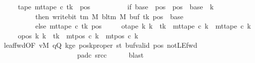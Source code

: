 \begin{isabellebody}
\ \ \ \ \ tape{}{\isacharcolon}{\kern0pt}\ {\isachardoublequoteopen}mt{\isacharunderscore}{\kern0pt}tape\ c{}\ tk\ {\isacharequal}{\kern0pt}\ {\isacharparenleft}{\kern0pt}{\isasymlambda}pos{\isachardot}{\kern0pt}\isanewline
\ \ \ \ \ \ \ \ \ \ if\ base\ {\isasymle}\ pos\ {\isasymand}\ pos\ {\isacharless}{\kern0pt}\ base\ {\isacharplus}{\kern0pt}\ {\isacharparenleft}{\kern0pt}{\isacharquery}{\kern0pt}k\ {\isacharminus}{\kern0pt}\ {}{\isacharparenright}{\kern0pt}\isanewline
\ \ \ \ \ \ \ \ \ \ then\ write{\isacharunderscore}{\kern0pt}bit\ {\isacharparenleft}{\kern0pt}{\isasymGamma}{\isacharunderscore}{\kern0pt}tm\ M{\isacharparenright}{\kern0pt}\ {\isacharparenleft}{\kern0pt}bl{\isacharunderscore}{\kern0pt}tm\ M{\isacharparenright}{\kern0pt}\ {\isacharparenleft}{\kern0pt}buf\ tk{\isacharparenright}{\kern0pt}\ {\isacharparenleft}{\kern0pt}pos\ {\isacharminus}{\kern0pt}\ base{\isacharparenright}{\kern0pt}\isanewline
\ \ \ \ \ \ \ \ \ \ else\ mt{\isacharunderscore}{\kern0pt}tape\ c{}\ tk\ pos{\isacharparenright}{\kern0pt}{\isachardoublequoteclose}\isanewline
\ \ \ \ \ otape{}{\isacharcolon}{\kern0pt}\ {\isachardoublequoteopen}{\isasymforall}k{\isacharprime}{\kern0pt}{\isachardot}{\kern0pt}\ k{\isacharprime}{\kern0pt}\ {\isasymnoteq}\ tk\ {\isasymlongrightarrow}\ mt{\isacharunderscore}{\kern0pt}tape\ c{}\ k{\isacharprime}{\kern0pt}\ {\isacharequal}{\kern0pt}\ mt{\isacharunderscore}{\kern0pt}tape\ c{}\ k{\isacharprime}{\kern0pt}{\isachardoublequoteclose}\isanewline
\ \ \ \ \ opos{}{\isacharcolon}{\kern0pt}\ {\isachardoublequoteopen}{\isasymforall}k{\isacharprime}{\kern0pt}{\isachardot}{\kern0pt}\ k{\isacharprime}{\kern0pt}\ {\isasymnoteq}\ tk\ {\isasymlongrightarrow}\ mt{\isacharunderscore}{\kern0pt}pos\ c{}\ k{\isacharprime}{\kern0pt}\ {\isacharequal}{\kern0pt}\ mt{\isacharunderscore}{\kern0pt}pos\ c{}\ k{\isacharprime}{\kern0pt}{\isachardoublequoteclose}\isanewline
\ \ \ \ \isamarkupfalse%
\ leaf{\isacharunderscore}{\kern0pt}fwd{\isacharbrackleft}{\kern0pt}OF\ vM\ qQ\ kge{}\ poskproper\ st{}\ buf{\isacharunderscore}{\kern0pt}valid\ pos{}\ notLE{\isacharunderscore}{\kern0pt}fwd\isanewline
\ \ \ \ \ \ \ \ \ \ \ \ \ \ \ \ \ \ \ \ \ \ pad{\isacharunderscore}{\kern0pt}c{}\ src{\isacharunderscore}{\kern0pt}c{}{\isacharbrackright}{\kern0pt}\isanewline
\ \ \ \ \isamarkupfalse%
\ blast\isanewline

\end{isabellebody}
